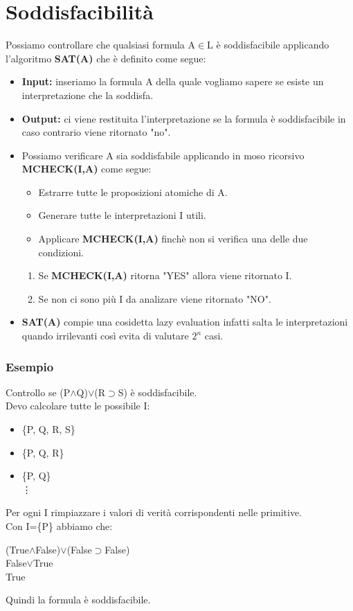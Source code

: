 \documentclass[../main.tex]{subfiles}
\begin{document}
    \section{Soddisfacibilità}
    Possiamo controllare che qualsiasi formula A$\in$L è soddisfacibile applicando l'algoritmo \textbf{SAT(A)} che è definito come segue:
    \begin{itemize}
        \item \textbf{Input:} inseriamo la formula A della quale vogliamo sapere se esiste un interpretazione che la soddisfa.
        \item \textbf{Output:} ci viene restituita l'interpretazione se la formula è soddisfacibile in caso contrario viene ritornato "no".
        \item Possiamo verificare A sia soddisfabile applicando in moso ricorsivo \textbf{MCHECK(I,A)} come segue:
        \begin{itemize}
            \item Estrarre tutte le proposizioni atomiche di A.
            \item Generare tutte le interpretazioni I utili.
            \item Applicare \textbf{MCHECK(I,A)} finchè non si verifica una delle due condizioni.
        \end{itemize}
        \begin{enumerate}
            \item Se \textbf{MCHECK(I,A)} ritorna "YES" allora viene ritornato I.
            \item Se non ci sono più I da analizare viene ritornato "NO".
        \end{enumerate}
        \item \textbf{SAT(A)} compie una cosidetta lazy evaluation infatti salta le interpretazioni quando irrilevanti così evita di valutare $2^n$ casi.
    \end{itemize}

    \subsubsection{Esempio}
    Controllo se (P$\land$Q)$\lor$(R$\supset$S) è soddisfacibile.\\
    Devo calcolare tutte le possibile I:
    \begin{itemize}
        \item \{P, Q, R, S\}
        \item \{P, Q, R\}
        \item \{P, Q\}\\
        \vdots
    \end{itemize}
    Per ogni I rimpiazzare i valori di verità corrispondenti nelle primitive.\\
    Con I=\{P\} abbiamo che:
    \begin{center}
        (True$\land$False)$\lor$(False$\supset$False)\\
        False$\lor$True\\
        True
    \end{center}
    Quindi la formula è soddisfacibile.
\end{document}
